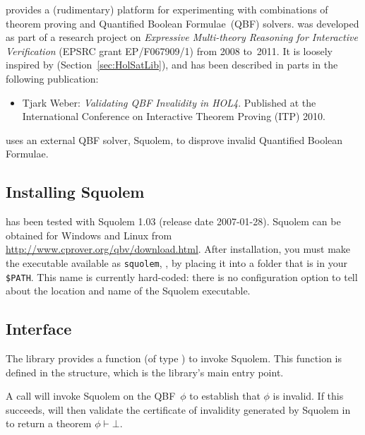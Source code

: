 
\setcounter{sessioncount}{0}

 provides a (rudimentary) platform for experimenting
with combinations of theorem proving and Quantified Boolean
Formulae~(QBF) solvers.   was developed as part of a
research project on {\it Expressive Multi-theory Reasoning for
  Interactive Verification} (EPSRC grant EP/F067909/1) from 2008
to~2011.  It is loosely inspired by 
(Section~\ref{sec:HolSatLib}), and has been described in parts in the
following publication:
\begin{itemize}
\item Tjark Weber: {\it Validating QBF Invalidity in HOL4}.  Published
  at the International Conference on Interactive Theorem Proving (ITP)
  2010.
\end{itemize}
 uses an external QBF solver, Squolem, to disprove
invalid Quantified Boolean Formulae.

\subsection{Installing Squolem}

 has been tested with Squolem 1.03 (release date
2007-01-28).  Squolem can be obtained for Windows and Linux from
\url{http://www.cprover.org/qbv/download.html}.  After installation,
you must make the executable available as {\tt squolem}, \eg, by
placing it into a folder that is in your {\tt \$PATH}.  This name is
currently hard-coded: there is no configuration option to tell \HOL{}
about the location and name of the Squolem executable.

\subsection{Interface}
\label{qbf-interface}

The library provides a function  (of type ) to invoke Squolem.  This function is defined in the
 structure, which is the library's main entry point.

A call  will invoke Squolem on the QBF~$\phi$ to
establish that $\phi$ is invalid.  If this succeeds, 
will then validate the certificate of invalidity generated by Squolem
in \HOL{} to return a theorem $\phi \vdash \bot$.

